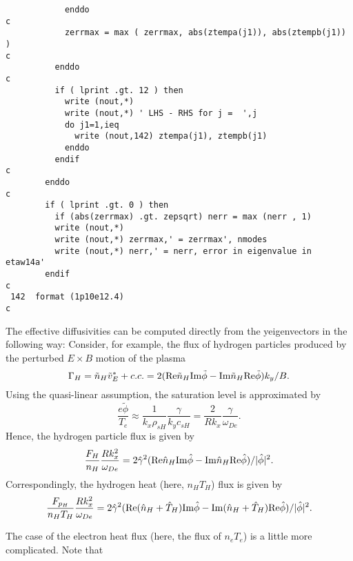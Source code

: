 \begin{verbatim}
            enddo
c
            zerrmax = max ( zerrmax, abs(ztempa(j1)), abs(ztempb(j1)) )
c
          enddo
c
          if ( lprint .gt. 12 ) then
            write (nout,*)
            write (nout,*) ' LHS - RHS for j =  ',j
            do j1=1,ieq
              write (nout,142) ztempa(j1), ztempb(j1)
            enddo
          endif
c
        enddo
c
        if ( lprint .gt. 0 ) then
          if (abs(zerrmax) .gt. zepsqrt) nerr = max (nerr , 1)
          write (nout,*) 
          write (nout,*) zerrmax,' = zerrmax', nmodes
          write (nout,*) nerr,' = nerr, error in eigenvalue in etaw14a'
        endif
c
 142  format (1p10e12.4)
c
\end{verbatim}

The effective diffusivities can be computed directly from the 
yeigenvectors in the following way:
Consider, for example, the flux of hydrogen particles produced by
the perturbed $ E \times B $ motion of the plasma
\[ \Gamma_H = \tilde{n}_H \tilde{v}_E^* + c.c. 
 = 2 ( {\rm Re} \tilde{n}_H {\rm Im} \tilde{\phi}
     - {\rm Im} \tilde{n}_H {\rm Re} \tilde{\phi} ) k_y / B. \]
Using the quasi-linear assumption, the saturation level is 
approximated by
\[ \frac{e \tilde{\phi}}{T_e}
 \approx \frac{1}{k_x \rho_{sH}} \frac{ \gamma }{ k_y c_{sH} }
 = \frac{2}{R k_x} \frac{\gamma}{\omega_{De}}. \]
Hence, the hydrogen particle flux is given by
\[ \frac{ F_H }{ n_H } \frac{ R k_x^2 }{ \omega_{De} }
  = 2 \hat{\gamma}^2
  ( {\rm Re} \hat{n}_H {\rm Im} \hat{\phi}
  - {\rm Im} \hat{n}_H {\rm Re} \hat{\phi} ) / | \hat{\phi} |^2.
   \]
Correspondingly, the hydrogen heat (here, $ n_H T_H $) flux is given by
\[ \frac{ F_{p_H} }{ n_H T_H } \frac{ R k_x^2 }{ \omega_{De} }
  = 2 \hat{\gamma}^2
  ( {\rm Re} ( \hat{n}_H + \hat{T}_H ) {\rm Im} \hat{\phi}
  - {\rm Im} ( \hat{n}_H + \hat{T}_H ) {\rm Re} \hat{\phi} )
    / | \hat{\phi} |^2.
   \]

The case of the electron heat flux (here, the flux of $ n_e T_e $)
is a little more complicated.  Note that

